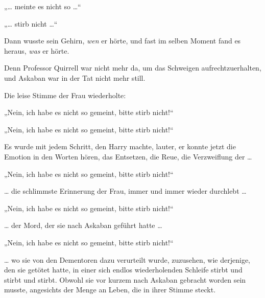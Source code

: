 „… meinte es nicht so …“

„… stirb nicht …“

Dann wusste sein Gehirn, \emph{wen} er hörte, und fast im selben Moment fand es heraus, \emph{was} er hörte.

Denn Professor Quirrell war nicht mehr da, um das Schweigen aufrechtzuerhalten, und Askaban war in der Tat nicht mehr still.

Die leise Stimme der Frau wiederholte:

„Nein, ich habe es nicht so gemeint, bitte stirb nicht!“

„Nein, ich habe es nicht so gemeint, bitte stirb nicht!“

Es wurde mit jedem Schritt, den Harry machte, lauter, er konnte jetzt die Emotion in den Worten hören, das Entsetzen, die Reue, die Verzweiflung der …

„Nein, ich habe es nicht so gemeint, bitte stirb nicht!“

… die schlimmste Erinnerung der Frau, immer und immer wieder durchlebt …

„Nein, ich habe es nicht so gemeint, bitte stirb nicht!“

… der Mord, der sie nach Askaban geführt hatte …

„Nein, ich habe es nicht so gemeint, bitte stirb nicht!“

… wo sie von den Dementoren dazu verurteilt wurde, zuzusehen, wie derjenige, den sie getötet hatte, in einer sich endlos wiederholenden Schleife stirbt und stirbt und stirbt. Obwohl sie vor kurzem nach Askaban gebracht worden sein musste, angesichts der Menge an Leben, die in ihrer Stimme steckt.


